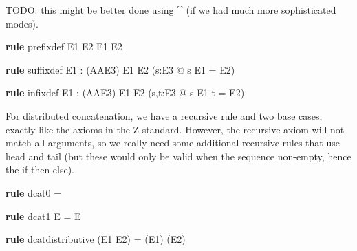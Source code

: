 \documentclass{article}
\newenvironment{zedrule}[1]{\par\textbf{rule }#1\vspace{-1ex}\infrule}{\endinfrule}
\newcommand{\derives}{\derive{}}
\newcommand{\arithmos}{{A\!\!\!\!A}}   %
\newcommand{\proviso}{\raisebox{0.5ex}{${}_{\blacktriangleright}\ $}}%
\begin{document}
TODO: this might be better done using $\cat$
(if we had much more sophisticated modes).
\begin{zedrule}{prefixdef}
   E1 \prefix E2 \iff E1 \subseteq E2
\end{zedrule}

\begin{zedrule}{suffixdef}
   \proviso E1 : \power (\arithmos \cross E3)
\derives
   E1 \suffix E2 \iff (\exists s:\seq E3 @ s \cat E1 = E2)
\end{zedrule}

\begin{zedrule}{infixdef}
   \proviso E1 : \power (\arithmos \cross E3)
\derives
   E1 \infix E2 \iff (\exists s,t:\seq E3 @ s \cat E1 \cat t = E2)
\end{zedrule}

For distributed concatenation, we have a recursive rule and
two base cases, exactly like the axioms in the Z standard.
However, the recursive axiom will not match all arguments,
so we really need some additional recursive rules that use 
head and tail (but these would only be valid when the sequence
non-empty, hence the if-then-else). 
\begin{zedrule}{dcat0}
   \dcat \langle \rangle = \langle \rangle
\end{zedrule}
\begin{zedrule}{dcat1}
   \dcat \langle E \rangle = E
\end{zedrule}
\begin{zedrule}{dcatdistributive}
   \dcat (E1 \cat E2) = (\dcat E1) \cat (\dcat E2)
\end{zedrule}

\end{document}
